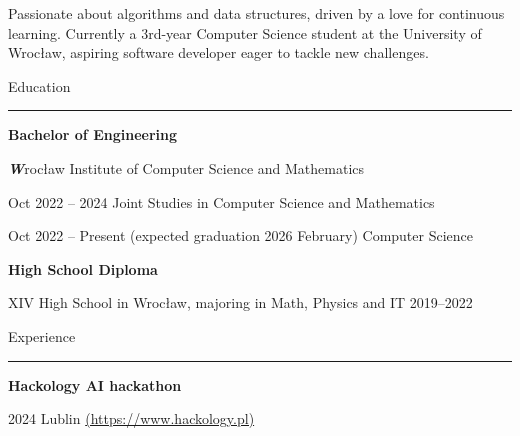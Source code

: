\documentclass{letter}
\begin{document}
\hfill
\begin{minipage}[t]{0.70\textwidth}
\setlength{\baselineskip}{1.5\baselineskip}

\begin{tcolorbox}[colback=white, colframe=white, width=\textwidth, boxrule=0pt, sharp corners, height=\textheight, left=5mm, right=5mm, top=5mm, bottom=5mm]

\color{black}

\vspace{0.5cm}
{\fontsize{30pt}{1pt} \textbf \FullName}

\vspace{0.3cm}

\begin{spacing}{1.125}
\small 
Passionate about algorithms and data structures, driven by a love for continuous learning. Currently a 3rd-year Computer Science student at the University of Wrocław, aspiring software developer eager to tackle new challenges.

\end{spacing}

\vspace{\SectionSpacing}

{\large Education}
\rule{\linewidth}{0.4pt}

{\large \textbf{Bachelor of Engineering}} 

{ 
{\textit \textbf Wrocław Institute of Computer Science and Mathematics}

{\small Oct 2022 -- 2024}
{Joint Studies in Computer Science and Mathematics }

{\small Oct 2022 -- Present (expected graduation 2026 February)}
{Computer Science}

}

{\large \textbf{High School Diploma}}

{ 
{\small XIV High School in Wrocław, majoring in Math, Physics and IT  2019--2022}

}

\vspace{\SectionSpacing}

{\large Experience}
\rule{\linewidth}{0.4pt}

{   

\vspace{1mm}

\textbf{Hackology AI hackathon} 

{\small 2024 Lublin \href{https://www.hackology.pl/}{(https://www.hackology.pl)}}

}
\end{tcolorbox}
\end{minipage}
\end{document}
